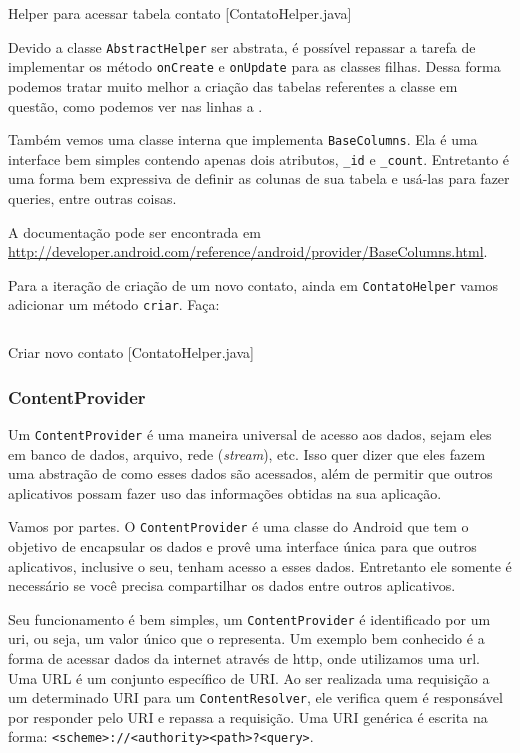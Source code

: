 \begin{listing}[H]
  \inputminted[linenos=true,frame=bottomline,tabsize=3]{ java }{ source/ContatoHelper-1.java }
  \caption{Helper para acessar tabela contato [ContatoHelper.java]}
\end{listing}

Devido a classe \texttt{AbstractHelper} ser abstrata, é possível
repassar a tarefa de implementar os método \texttt{onCreate} e
\texttt{onUpdate} para as classes filhas. Dessa forma podemos tratar
muito melhor a criação das tabelas referentes a classe em questão, como
podemos ver nas linhas  a .

Também vemos uma classe interna que implementa \texttt{BaseColumns}. Ela
é uma interface bem simples contendo apenas dois atributos,
\texttt{\_id} e \texttt{\_count}. Entretanto é uma forma bem expressiva
de definir as colunas de sua tabela e usá-las para fazer queries, entre
outras coisas.

A documentação pode ser encontrada em
\url{http://developer.android.com/reference/android/provider/BaseColumns.html}.

Para a iteração de criação de um novo contato, ainda em
\texttt{ContatoHelper} vamos adicionar um método \texttt{criar}. Faça:

\begin{listing}[H]
  \inputminted[linenos=true,frame=bottomline,tabsize=3]{ java }{ source/ContatoHelper-2.java }
  \caption{Criar novo contato [ContatoHelper.java]}
\end{listing}

\subsubsection{ContentProvider}

Um \texttt{ContentProvider} é uma maneira universal de acesso aos dados,
sejam eles em banco de dados, arquivo, rede (\emph{stream}), etc. Isso
quer dizer que eles fazem uma abstração de como esses dados são
acessados, além de permitir que outros aplicativos possam fazer uso das
informações obtidas na sua aplicação.

Vamos por partes. O \texttt{ContentProvider} é uma classe do Android que
tem o objetivo de encapsular os dados e provê uma interface única para
que outros aplicativos, inclusive o seu, tenham acesso a esses dados.
Entretanto ele somente é necessário se você precisa compartilhar os
dados entre outros aplicativos.

Seu funcionamento é bem simples, um \texttt{ContentProvider} é
identificado por um \gls{uri}, ou seja, um valor único que o representa.
Um exemplo bem conhecido é a forma de acessar dados da internet através
de \gls{http}, onde utilizamos uma \gls{url}. Uma URL é um conjunto
específico de URI. Ao ser realizada uma requisição a um determinado URI
para um \texttt{ContentResolver}, ele verifica quem é responsável por
responder pelo URI e repassa a requisição. Uma URI genérica é escrita na
forma:
\texttt{\textless{}scheme\textgreater{}://\textless{}authority\textgreater{}\textless{}path\textgreater{}?\textless{}query\textgreater{}}.

